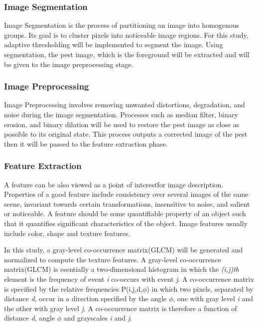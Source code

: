 \documentclass[journal]{./IEEE/IEEEtran}
\begin{document}
	\subsubsection{Image Segmentation}
	Image Segmentation is the process of partitioning an image into homogenous groups. Its goal is to cluster pixels into noticeable image regions.\cite{electronic_segmentation} For this study, adaptive thresholding will be implemented to segment the image. Using segmentation, the pest image, which is the foreground will be extracted and will be given to the image preprocessing stage.
	\subsubsection{Image Preprocessing}
	Image Preprocessing involves removing unwanted distortions, degradation, and noise during the image segmentation.\cite{electronic_preprocessing} Processes such as median filter, binary erosion, and binary dilation will be used to restore the pest image as close as possible to its original state. This process outputs a corrected image of the pest then it will be passed to the feature extraction phase.
	\subsubsection{Feature Extraction}
	A feature can be also viewed as a \"point of interest\" for image description. Properties of a good feature include consistency over several images of the same scene, invariant towards certain transformations, insensitive to noise, and salient or noticeable. A feature should be some quantifiable property of an object such that it quantifies significant characteristics of the object. Image features usually include color, shape and texture features.\cite{electronic_feature} 

	In this study, a gray-level co-occurrence matrix(GLCM) will be generated and normalized to compute the texture features. A gray-level co-occurrence matrix(GLCM) is esentially a two-dimensional histogram in which the \textit{(i,j)th} element is the frequency of event \textit{i} co-occurs with event \textit{j}. A co-occurrence matrix is specified by the relative frequencies P(i,j,d,$ \phi $) in which two pixels, separated by distance \textit{d}, occur in a direction specified by the angle $ \phi $, one with gray level \textit{i} and the other with gray level \textit{j}. A co-occurrence matrix is therefore a function of distance \textit{d}, angle $ \phi $ and grayscales \textit{i} and \textit{j}.\cite{article_manaa} 
\end{document}
